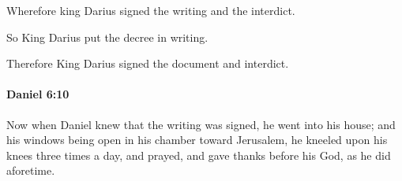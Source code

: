 			\begin{versebox}
					\item[BHS] 
					\item[LXX] 
					\item[ASV] Wherefore king Darius signed the writing and the interdict.
					\item[NIV] So King Darius put the decree in writing.
					\item[NRSV] Therefore King Darius signed the document and interdict.
			\end{versebox}

		\paragraph{Daniel 6:10} %
			\label{DANIEL-6-10}

			Now when Daniel knew that the writing was signed, he went into his house; and his windows being open in his chamber toward Jerusalem, he kneeled upon his knees three times a day, and prayed, and gave thanks before his God, as he did aforetime.


